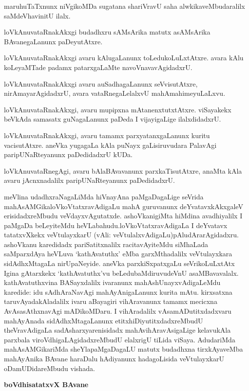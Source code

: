 maruhuTaTxnunx niVgikoMDa sugatana shariVravU saha alwkikaveMbudaralilx saMdeVhavinitU ilalx.

loVkAnuvataRnakAkxgi budadhxru sAMsArika matutx asAMsArika BAvanegaLanunx paDeyutAtxre.

loVkAnuvataRnakAkxgi avaru kAlugaLanunx toLedukoLuLxtAtxre. avara kAlu koLeyaMTade padamx patarxgaLaMte navoVnavavAgidadxrU.

loVkAnuvataRnakAkxgi avaru auSadhagaLanunx seVvisutAtxre, nirAmayarAgidadxrU, avara vataRnegaLelalxvU mahAmahimeyuLaLxvu.

loVkAnuvataRnakAkxgi, avaru mupipxna mAtanenxtutxtAtxre. viSayakekx beVkAda samasatx guNagaLanunx paDeda I vijayigaLige ilalxdidadxrU.

loVkAnuvataRnakAkxgi, avaru tamamx parxyatanxgaLanunx kuritu vacisutAtxre. aneVka yugagaLa kAla puNayx gaLisiruvudara PalavAgi paripUNaRteyanunx paDedidadxrU kUDa.

loVkAnuvataRnegAgi, avaru bAlaBAvavanunx parxkaTisutAtxre, anaMta kAla avaru jAcnxnadalilx paripUNaRteyanunx paDedidadxrU.

meVlina udadhxraNagaLiMda hiVnayAna paMgaDagaLige seVrida mahAsAMGika\break loVkoVtatxravAdigaLu mahA guruvanunx deYvatavxkAkxgaleV erisidadxreMbudu veVdayx\-vAgu\-tatxde. ashoVkanigiMta hiMdina avadhiyalilx I paMgaDa beLeyiteMdu heVLabahudu.\break loVkoVtatxravAdigaLa I deYvatavx tatatxvXkekx veVtulayxkarU (vAli: veVtulalxvAdigaLu)\break pAludArarAgidadxru. ashoVkanu karedidadx pariSatitxnalilx racitavAyiteMdu siMha\-Lada saMparxdAya heVLuva `kathAvatuthx' eMba garxMthadalilx veVtulayxkara sidAdhxMtagaLa nirU\-paNe\-yide. aneVka parxkiSxpatxgaLu seVrikoLuLxtAtx Igina gAtarxkekx `kathAvatuthx'vu beLedubaMdiruvu\-deVnU asaMBavavalalx. kathAvatuthxvina BASayxdalilx ivaranunx mahAshUnayxvAdigaLeMdu karedide: idu sAdhAraNavAgi mahAyAnigaLanunx kurita mAtu. kirxsatxna taruvAyada\break kAladalilx ivaru aBayagiri vihAravanunx tamamx mecicxna AvAsasAthxnavAgi mADi\break\-koMDaru. I vihAradalilx vAsamADutitxdadxvaru mahAyAnada sidAdhxMtagaLanunx etitx\-hiDiyutitxdadxreMbudU theVravAdigaLa sadAsharxyarenisidadx mahAvihAravAsigaLige kelavu\-kAla parxbala viroVdhigaLAgidadxreMbudU elalxrigU tiLida viSaya. AdudariMda mahA\-sAMGikariMda sheYlapaMgaDagaLU matutx budadhxna tirxkAyaveMba mahAyAnika BAvane haraDalu hAdiyanunx hadagoLisida veVtulayxkarU oDamUDidareMbudu vishada.

\begin{center}
{\textbf{\Large boVdhisatatxvX BAvane}}
\end{center}

